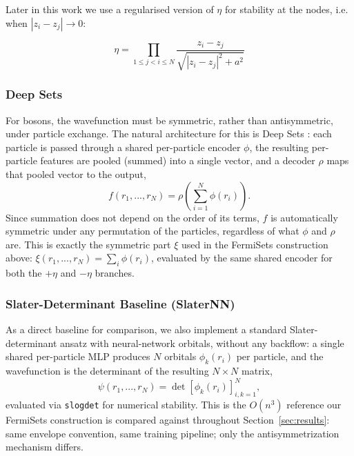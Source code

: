 \documentclass[a4paper,11pt,twoside]{article}
\begin{document}
Later in this work we use a regularised version of $\eta$ for stability at the nodes, i.e. when $|z_i - z_j| \rightarrow 0$:

\begin{equation}
\label{eq:eta}
\eta = \prod_{1 \le j < i \le N} \frac{z_i - z_j}{\sqrt{|z_i - z_j|^2 + a^2}}
\end{equation}

\subsubsection{Deep Sets}
\label{tab:deepsets}

For bosons, the wavefunction must be symmetric, rather than antisymmetric, under particle exchange. The natural architecture for this is Deep Sets \cite{zaheer_deep_2018}: each particle is passed through a shared per-particle encoder $\phi$, the resulting per-particle features are pooled (summed) into a single vector, and a decoder $\rho$ maps that pooled vector to the output,
\begin{equation}
    f(r_1, ..., r_N) = \rho\left(\sum_{i=1}^N \phi(r_i)\right).
\end{equation}
Since summation does not depend on the order of its terms, $f$ is automatically symmetric under any permutation of the particles, regardless of what $\phi$ and $\rho$ are. This is exactly the symmetric part $\xi$ used in the FermiSets construction above: $\xi(r_1,...,r_N) = \sum_i \phi(r_i)$, evaluated by the same shared encoder for both the $+\eta$ and $-\eta$ branches.

\subsubsection{Slater-Determinant Baseline (SlaterNN)}
\label{sec:slaternn}

As a direct baseline for comparison, we also implement a standard Slater-determinant ansatz with neural-network orbitals, without any backflow: a single shared per-particle MLP produces $N$ orbitals $\phi_k(r_i)$ per particle, and the wavefunction is the determinant of the resulting $N \times N$ matrix,
\begin{equation}
    \psi(r_1,...,r_N) = \det\left[\phi_k(r_i)\right]_{i,k=1}^N,
\end{equation}
evaluated via \texttt{slogdet} for numerical stability. This is the $O(n^3)$ reference our FermiSets construction is compared against throughout Section~\ref{sec:results}: same envelope convention, same training pipeline; only the antisymmetrization mechanism differs.
\end{document}
